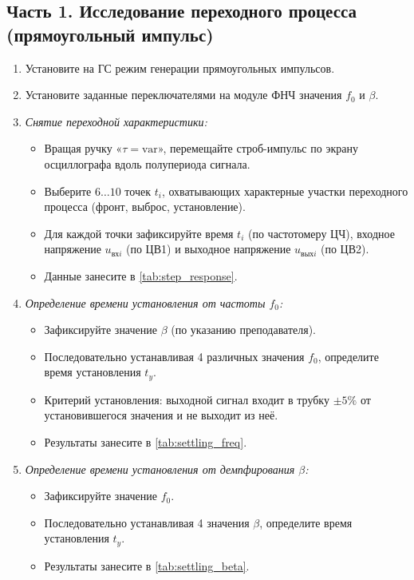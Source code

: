 \subsection*{Часть 1. Исследование переходного процесса (прямоугольный импульс)}
\begin{enumerate}
    \item Установите на ГС режим генерации прямоугольных импульсов.
    \item Установите заданные переключателями на модуле ФНЧ значения $f_0$ и $\beta$.
    \item \textit{Снятие переходной характеристики:}
    \begin{itemize}
        \item Вращая ручку «$\tau = \text{var}$», перемещайте строб-импульс по экрану осциллографа вдоль полупериода сигнала.
        \item Выберите $6\dots10$ точек $t_i$, охватывающих характерные участки переходного процесса (фронт, выброс, установление).
        \item Для каждой точки зафиксируйте время $t_i$ (по частотомеру ЦЧ), входное напряжение $u_{\text{вх} i}$ (по ЦВ1) и выходное напряжение $u_{\text{вых} i}$ (по ЦВ2).
        \item Данные занесите в \cref{tab:step_response}.
    \end{itemize}
    \item \textit{Определение времени установления от частоты $f_0$:}
    \begin{itemize}
        \item Зафиксируйте значение $\beta$ (по указанию преподавателя).
        \item Последовательно устанавливая 4 различных значения $f_0$, определите время установления $t_y$.
        \item Критерий установления: выходной сигнал входит в трубку $\pm 5\%$ от установившегося значения и не выходит из неё.
        \item Результаты занесите в \cref{tab:settling_freq}.
    \end{itemize}
    \item \textit{Определение времени установления от демпфирования $\beta$:}
    \begin{itemize}
        \item Зафиксируйте значение $f_0$.
        \item Последовательно устанавливая 4 значения $\beta$, определите время установления $t_y$.
        \item Результаты занесите в \cref{tab:settling_beta}.
    \end{itemize}
\end{enumerate}

